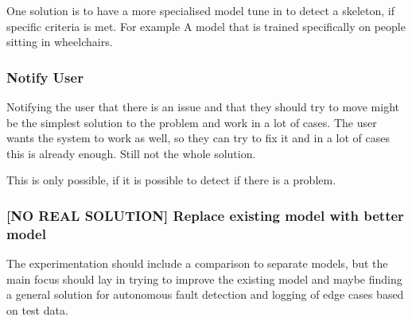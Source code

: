 One solution is to have a more specialised model tune in to detect a skeleton, if specific criteria is met. For example A model that is trained specifically on people sitting in wheelchairs.

\subsubsection{Notify User}

Notifying the user that there is an issue and that they should try to move might be the simplest solution to the problem and work in a lot of cases. The user wants the system to work as well, so they can try to fix it and in a lot of cases this is already enough. Still not the whole solution.

This is only possible, if it is possible to detect if there is a problem.

\subsubsection{[NO REAL SOLUTION] Replace existing model with better model}

The experimentation should include a comparison to separate models, but the main focus should lay in trying to improve the existing model and maybe finding a general solution for autonomous fault detection and logging of edge cases based on test data.